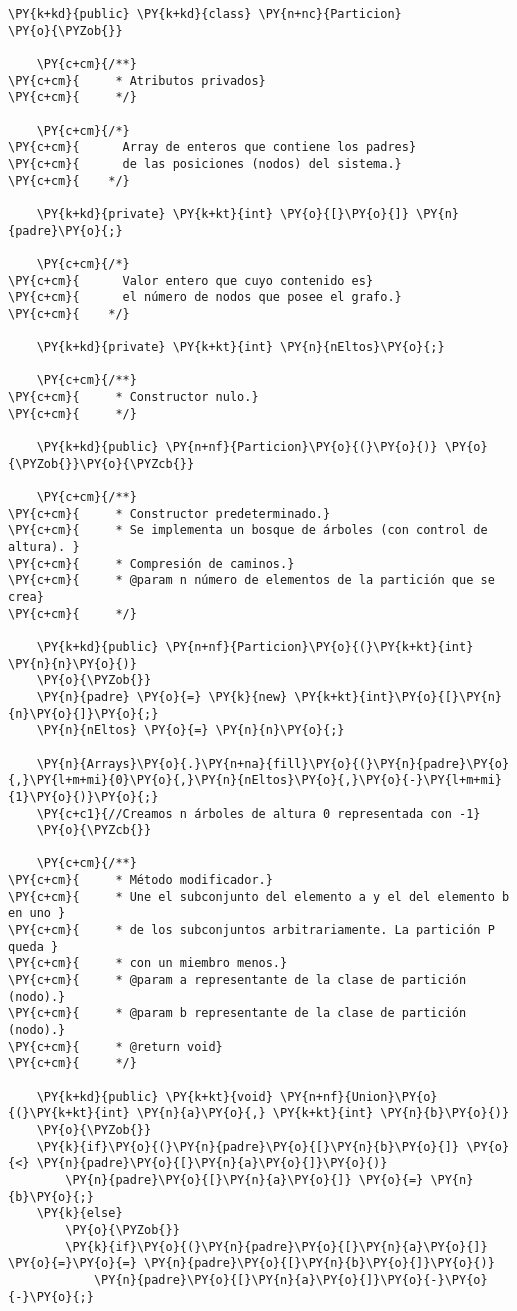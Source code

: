 \begin{Verbatim}[commandchars=\\\{\}]
\PY{k+kd}{public} \PY{k+kd}{class} \PY{n+nc}{Particion}
\PY{o}{\PYZob{}}

    \PY{c+cm}{/**}
\PY{c+cm}{     * Atributos privados}
\PY{c+cm}{     */}

    \PY{c+cm}{/*}
\PY{c+cm}{      Array de enteros que contiene los padres}
\PY{c+cm}{      de las posiciones (nodos) del sistema.}
\PY{c+cm}{    */}

    \PY{k+kd}{private} \PY{k+kt}{int} \PY{o}{[}\PY{o}{]} \PY{n}{padre}\PY{o}{;}

    \PY{c+cm}{/*}
\PY{c+cm}{      Valor entero que cuyo contenido es}
\PY{c+cm}{      el número de nodos que posee el grafo.}
\PY{c+cm}{    */}

    \PY{k+kd}{private} \PY{k+kt}{int} \PY{n}{nEltos}\PY{o}{;}

    \PY{c+cm}{/**}
\PY{c+cm}{     * Constructor nulo.}
\PY{c+cm}{     */}

    \PY{k+kd}{public} \PY{n+nf}{Particion}\PY{o}{(}\PY{o}{)} \PY{o}{\PYZob{}}\PY{o}{\PYZcb{}}

    \PY{c+cm}{/**}
\PY{c+cm}{     * Constructor predeterminado.}
\PY{c+cm}{     * Se implementa un bosque de árboles (con control de altura). }
\PY{c+cm}{     * Compresión de caminos.}
\PY{c+cm}{     * @param n número de elementos de la partición que se crea}
\PY{c+cm}{     */}

    \PY{k+kd}{public} \PY{n+nf}{Particion}\PY{o}{(}\PY{k+kt}{int} \PY{n}{n}\PY{o}{)}
    \PY{o}{\PYZob{}}
	\PY{n}{padre} \PY{o}{=} \PY{k}{new} \PY{k+kt}{int}\PY{o}{[}\PY{n}{n}\PY{o}{]}\PY{o}{;}
	\PY{n}{nEltos} \PY{o}{=} \PY{n}{n}\PY{o}{;}

	\PY{n}{Arrays}\PY{o}{.}\PY{n+na}{fill}\PY{o}{(}\PY{n}{padre}\PY{o}{,}\PY{l+m+mi}{0}\PY{o}{,}\PY{n}{nEltos}\PY{o}{,}\PY{o}{-}\PY{l+m+mi}{1}\PY{o}{)}\PY{o}{;}
	\PY{c+c1}{//Creamos n árboles de altura 0 representada con -1}
    \PY{o}{\PYZcb{}}

    \PY{c+cm}{/**}
\PY{c+cm}{     * Método modificador.}
\PY{c+cm}{     * Une el subconjunto del elemento a y el del elemento b en uno }
\PY{c+cm}{     * de los subconjuntos arbitrariamente. La partición P queda }
\PY{c+cm}{     * con un miembro menos.}
\PY{c+cm}{     * @param a representante de la clase de partición (nodo).}
\PY{c+cm}{     * @param b representante de la clase de partición (nodo).}
\PY{c+cm}{     * @return void}
\PY{c+cm}{     */}
    
    \PY{k+kd}{public} \PY{k+kt}{void} \PY{n+nf}{Union}\PY{o}{(}\PY{k+kt}{int} \PY{n}{a}\PY{o}{,} \PY{k+kt}{int} \PY{n}{b}\PY{o}{)}
    \PY{o}{\PYZob{}}
	\PY{k}{if}\PY{o}{(}\PY{n}{padre}\PY{o}{[}\PY{n}{b}\PY{o}{]} \PY{o}{<} \PY{n}{padre}\PY{o}{[}\PY{n}{a}\PY{o}{]}\PY{o}{)}
	    \PY{n}{padre}\PY{o}{[}\PY{n}{a}\PY{o}{]} \PY{o}{=} \PY{n}{b}\PY{o}{;}
	\PY{k}{else}
	    \PY{o}{\PYZob{}}
	 	\PY{k}{if}\PY{o}{(}\PY{n}{padre}\PY{o}{[}\PY{n}{a}\PY{o}{]} \PY{o}{=}\PY{o}{=} \PY{n}{padre}\PY{o}{[}\PY{n}{b}\PY{o}{]}\PY{o}{)}
	 	    \PY{n}{padre}\PY{o}{[}\PY{n}{a}\PY{o}{]}\PY{o}{-}\PY{o}{-}\PY{o}{;}


\end{Verbatim}
